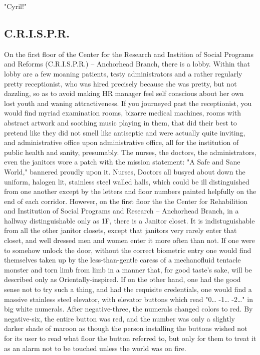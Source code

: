 \documentclass[12pt]{article}
\begin{document}
"Cyril!"

\subsection*{C.R.I.S.P.R.}
\label{sec:org808c997}

On the first floor of the Center for the Research and Instition of Social Programs and Reforms (C.R.I.S.P.R.) -- Anchorhead Branch, there is a lobby. Within that lobby are a few moaning patients, testy administrators and a rather regularly pretty receptionist, who was hired precisely because she was pretty, but not dazzling, so as to avoid making HR manager feel self conscious about her own lost youth and waning attractiveness. If you journeyed past the receptionist, you would find myriad examination rooms, bizarre medical machines, rooms with abstract artwork and soothing music playing in them, that did their best to pretend like they did not smell like antiseptic and were actually quite inviting, and administrative office upon administrative office, all for the institution of public health and sanity, presumably. The nurses, the doctors, the administrators, even the janitors wore a patch with the mission statement: "A Safe and Sane World," bannered proudly upon it. Nurses, Doctors all busyed about down the uniform, halogen lit, stainless steel walled halls, which could be ill distinguished from one another except by the letters and floor numbers painted helpfully on the end of each corridor. However, on the first floor the the Center for Rehabilition and Institution of Social Programs and Research -- Anchorhead Branch, in a hallway distinguishable only as 1F, there is a Janitor closet. It is indistuguishable from all the other janitor closets, except that janitors very rarely enter that closet, and well dressed men and women enter it more often than not. If one were to somehow unlock the door, without the correct biometric entry one would find themselves taken up by the less-than-gentle caress of a mechanofluid tentacle monster and torn limb from limb in a manner that, for good taste's sake, will be described only as Orientally-inspired. If on the other hand, one had the good sense not to try such a thing, and had the requisite credentials, one would find a massive stainless steel elevator, with elevator buttons which read "0\ldots{} -1\ldots{} -2\ldots{}" in big white numerals. After negative-three, the numerals changed colors to red. By negative-six, the entire button was red, and the number was only a slightly darker shade of maroon as though the person installing the buttons wished not for its user to read what floor the button referred to, but only for them to treat it as an alarm not to be touched unless the world was on fire.
\end{document}
